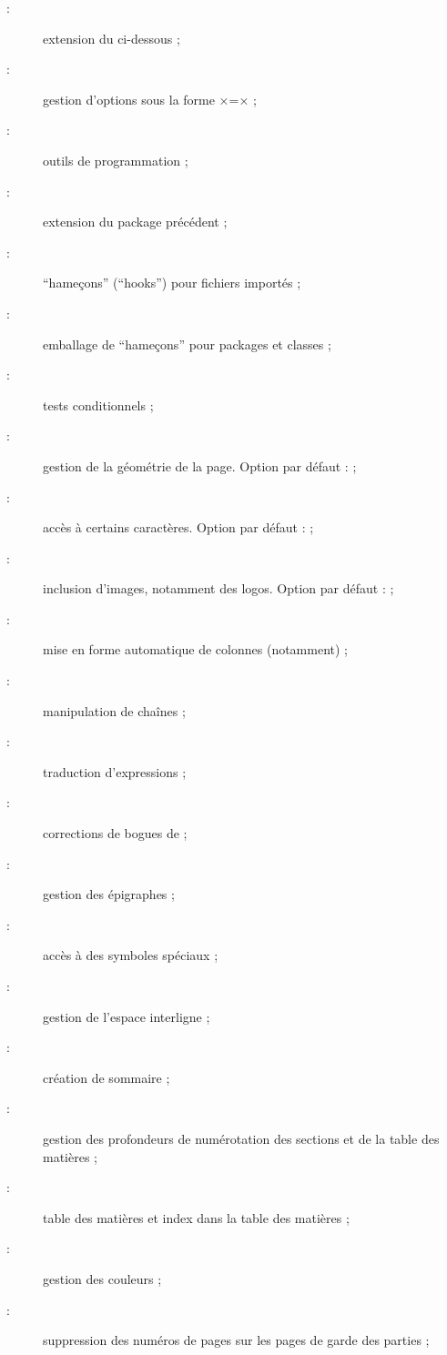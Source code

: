 \begin{description}
\item[ :] extension du  ci-dessous ;
\item[ :] gestion d'options sous la forme
  ×=× ;
\item[ :] outils de programmation ;
\item[ :] extension du package précédent ;
\item[ :] \enquote{hameçons} (\foreignquote{english}{hooks})
  pour fichiers importés ;
\item[ :] emballage de \enquote{hameçons} pour packages et classes ;
\item[ :] tests conditionnels ;
\item[ :] gestion de la géométrie de la page.
  Option par défaut :  ;
\item[ :] accès à certains caractères. Option par défaut :
   ;
\item[ :] inclusion d'images, notamment des logos.
  Option par défaut :  ;
\item[ :] mise en forme automatique de colonnes (notamment) ;
\item[ :] manipulation de chaînes ;
\item[ :] traduction d'expressions ;
\item[ :] corrections de bogues de 
  ;
\item[ :] gestion des épigraphes ;
\item[ :] accès à des symboles spéciaux ;
\item[ :] gestion de l'espace interligne ;
\item[ :] création de sommaire ;
\item[ :] gestion des profondeurs de numérotation des
  sections et de la table des matières ;
\item[ :] table des matières et index dans la
  table des matières ;
\item[ :] gestion des couleurs ;
\item[ :] suppression des numéros de pages sur
  les pages de garde des parties ;

\end{description}
